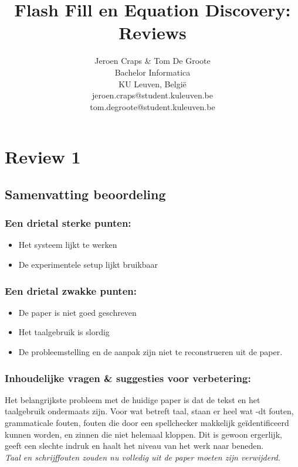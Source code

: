 \documentclass{article}
\title{Flash Fill en Equation Discovery: \\ Reviews}
\author{  Jeroen Craps \& Tom De Groote \\ \textnormal{Bachelor Informatica} \\ \textnormal{KU Leuven, Belgi\"e} \\ \textnormal{jeroen.craps@student.kuleuven.be} \\ \textnormal{tom.degroote@student.kuleuven.be} }
\begin{document}
\maketitle
\section{Review 1}
\subsection*{Samenvatting beoordeling}

\subsubsection*{Een drietal sterke punten:}
\begin{itemize}
\item Het systeem lijkt te werken
\item De experimentele setup lijkt bruikbaar
\end{itemize}

\subsubsection*{Een drietal zwakke punten:}
\begin{itemize}
\item De paper is niet goed geschreven
\item Het taalgebruik is slordig
\item De probleemstelling en de aanpak zijn niet te reconstrueren uit de paper.
\end{itemize}

\subsubsection*{Inhoudelijke vragen \& suggesties voor verbetering:}

Het belangrijkste probleem met de huidige paper is dat de tekst en het taalgebruik ondermaats zijn.
Voor wat betreft taal, staan er heel wat -dt fouten, grammaticale fouten, fouten die door een spellchecker makkelijk ge\"identificeerd kunnen worden, en zinnen die niet helemaal kloppen. Dit is gewoon ergerlijk, geeft een slechte indruk en haalt het niveau van het werk naar beneden.\\
\textit{Taal en schrijffouten zouden nu volledig uit de paper moeten zijn verwijderd.} \\ \\
\end{document}
